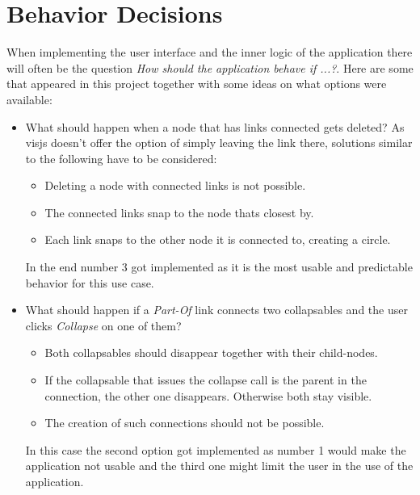 \newpage
\section{Behavior Decisions}
When implementing the user interface and the inner logic of the application there will often be the question \emph{How should the application behave if ...?}. Here are some that appeared in this project together with some ideas on what options were available:
\begin{itemize}
\item What should happen when a node that has links connected gets deleted? As visjs doesn't offer the option of simply leaving the link there, solutions similar to the following have to be considered:
\begin{itemize}
\item Deleting a node with connected links is not possible.
\item The connected links snap to the node thats closest by.
\item Each link snaps to the other node it is connected to, creating a circle.
\end{itemize}
In the end number 3 got implemented as it is the most usable and predictable behavior for this use case.

\item What should happen if a \emph{Part-Of} link connects two collapsables and the user clicks \emph{Collapse} on one of them?
\begin{itemize}
\item Both collapsables should disappear together with their child-nodes.
\item If the collapsable that issues the collapse call is the parent in the connection, the other one disappears. Otherwise both stay visible.
\item The creation of such connections should not be possible.
\end{itemize}
In this case the second option got implemented as number 1 would make the application not usable and the third one might limit the user in the use of the application.


\end{itemize}
